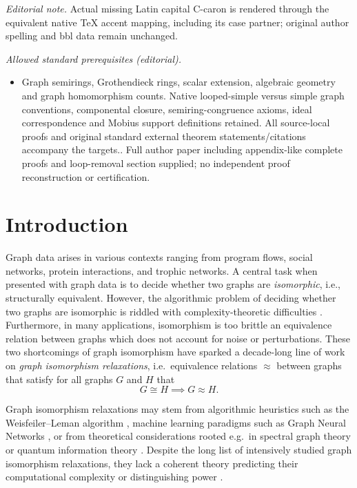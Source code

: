 \documentclass[11pt]{scrartcl}
\theoremstyle{definition}
\theoremstyle{plain}
\theoremstyle{remark}
\begin{document}
\noindent\textit{Editorial note.} Actual missing Latin capital C-caron is rendered through the equivalent native TeX accent mapping, including its case partner; original author spelling and bbl data remain unchanged.\par\medskip
\noindent\textit{Allowed standard prerequisites (editorial).}\begin{itemize}
\item Graph semirings, Grothendieck rings, scalar extension, algebraic geometry and graph homomorphism counts. Native looped-simple versus simple graph conventions, componental closure, semiring-congruence axioms, ideal correspondence and Mobius support definitions retained. All source-local proofs and original standard external theorem statements/citations accompany the targets.. Full author paper including appendix-like complete proofs and loop-removal section supplied; no independent proof reconstruction or certification.
\end{itemize}\medskip
	\section{Introduction}

	

	Graph data arises in various contexts ranging from program flows, social networks, protein interactions, and trophic networks.
	A central task when presented with graph data is to decide whether two graphs are \emph{isomorphic}, i.e.,
	structurally equivalent.
	However, the algorithmic problem of deciding whether two graphs are isomorphic is riddled with
	complexity-theoretic difficulties \cite{grohe_graph_2020}.
	Furthermore, in many applications, isomorphism is too brittle an equivalence relation between graphs which does not account for noise or perturbations.
	These two shortcomings of graph isomorphism have sparked a decade-long line of work 
	on \emph{graph isomorphism relaxations}, i.e.\
	equivalence relations $\approx$ between graphs that satisfy
	for all graphs $G$ and $H$ that
	\begin{equation} \label{eq:graph-iso-relax}
		G \cong H \implies G \approx H.
	\end{equation}

	Graph isomorphism relaxations may stem from algorithmic heuristics such as the Weisfeiler--Leman algorithm \cite{kiefer_weisfeiler-leman_2020},
	machine learning paradigms such as Graph Neural Networks \cite{grohe_logic_2021,xu_how_2019,morris_weisfeiler_2019}, or from
	theoretical considerations rooted e.g.\ in spectral graph theory or quantum information theory \cite{atserias_quantum_2019}.
	Despite the long list of intensively studied graph isomorphism relaxations,
	they lack a coherent theory predicting their computational complexity or distinguishing power \cite{grohe_thoughts_2025}.
\end{document}
